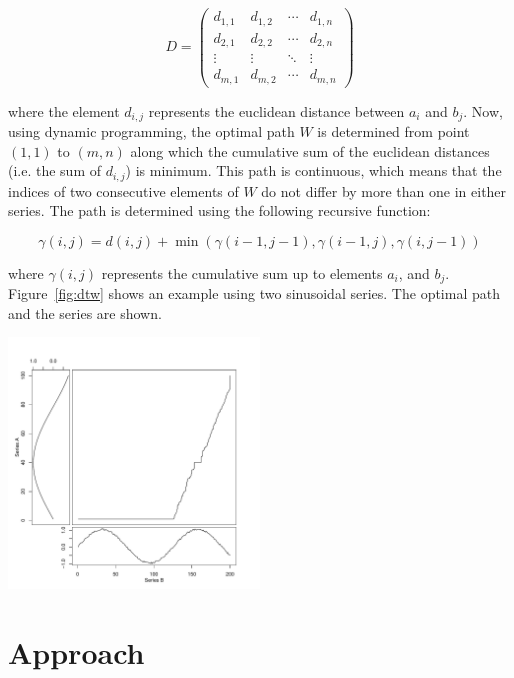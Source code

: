 \documentclass[%
 aip,
rsi,%
 amsmath,amssymb,
 reprint,%
author-year,
groupedaddress
]{revtex4-1}
\begin{document}
\begin{equation*}
D = 
 \begin{pmatrix}
  d_{1,1} & d_{1,2} & \cdots & d_{1,n} \\
  d_{2,1} & d_{2,2} & \cdots & d_{2,n} \\
  \vdots  & \vdots  & \ddots & \vdots  \\
  d_{m,1} & d_{m,2} & \cdots & d_{m,n} 
 \end{pmatrix}
\end{equation*}

where the element $d_{i,j}$ represents the euclidean distance between $a_i$ and $b_j$.
Now, using dynamic programming, the optimal path $W$ is determined from point $(1, 1)$ to $(m, n)$ along which the cumulative sum of the euclidean distances (i.e. the sum of $d_{i,j}$) is minimum. This path is continuous, which means that the indices of two consecutive elements of $W$ do not differ by more than one in either series. The path is determined using the following recursive function:

\begin{equation*}
\gamma(i,j) = d(i,j) + \min(\gamma(i-1,j-1), \gamma(i-1,j), \gamma(i,j-1))
\end{equation*}

where $\gamma(i,j)$ represents the cumulative sum up to elements $a_i$, and $b_j$. Figure~\ref{fig:dtw} shows an example using two sinusoidal series. The optimal path and the series are shown.

\begin{center}
  \includegraphics[width=0.5\textwidth]{dtw}
  \label{fig:dtw}
\end{center}

\section{\label{approach}Approach}
\end{document}
